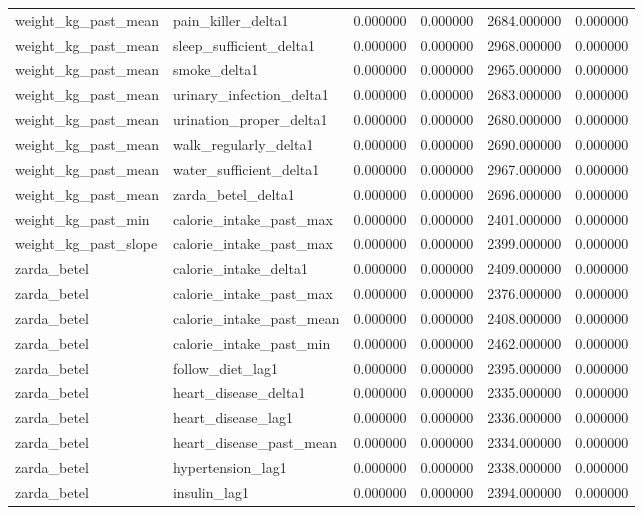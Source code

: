 \begin{longtable}{llrrrr}
weight\_kg\_past\_mean & pain\_killer\_delta1 & 0.000000 & 0.000000 & 2684.000000 & 0.000000 \\
weight\_kg\_past\_mean & sleep\_sufficient\_delta1 & 0.000000 & 0.000000 & 2968.000000 & 0.000000 \\
weight\_kg\_past\_mean & smoke\_delta1 & 0.000000 & 0.000000 & 2965.000000 & 0.000000 \\
weight\_kg\_past\_mean & urinary\_infection\_delta1 & 0.000000 & 0.000000 & 2683.000000 & 0.000000 \\
weight\_kg\_past\_mean & urination\_proper\_delta1 & 0.000000 & 0.000000 & 2680.000000 & 0.000000 \\
weight\_kg\_past\_mean & walk\_regularly\_delta1 & 0.000000 & 0.000000 & 2690.000000 & 0.000000 \\
weight\_kg\_past\_mean & water\_sufficient\_delta1 & 0.000000 & 0.000000 & 2967.000000 & 0.000000 \\
weight\_kg\_past\_mean & zarda\_betel\_delta1 & 0.000000 & 0.000000 & 2696.000000 & 0.000000 \\
weight\_kg\_past\_min & calorie\_intake\_past\_max & 0.000000 & 0.000000 & 2401.000000 & 0.000000 \\
weight\_kg\_past\_slope & calorie\_intake\_past\_max & 0.000000 & 0.000000 & 2399.000000 & 0.000000 \\
zarda\_betel & calorie\_intake\_delta1 & 0.000000 & 0.000000 & 2409.000000 & 0.000000 \\
zarda\_betel & calorie\_intake\_past\_max & 0.000000 & 0.000000 & 2376.000000 & 0.000000 \\
zarda\_betel & calorie\_intake\_past\_mean & 0.000000 & 0.000000 & 2408.000000 & 0.000000 \\
zarda\_betel & calorie\_intake\_past\_min & 0.000000 & 0.000000 & 2462.000000 & 0.000000 \\
zarda\_betel & follow\_diet\_lag1 & 0.000000 & 0.000000 & 2395.000000 & 0.000000 \\
zarda\_betel & heart\_disease\_delta1 & 0.000000 & 0.000000 & 2335.000000 & 0.000000 \\
zarda\_betel & heart\_disease\_lag1 & 0.000000 & 0.000000 & 2336.000000 & 0.000000 \\
zarda\_betel & heart\_disease\_past\_mean & 0.000000 & 0.000000 & 2334.000000 & 0.000000 \\
zarda\_betel & hypertension\_lag1 & 0.000000 & 0.000000 & 2338.000000 & 0.000000 \\
zarda\_betel & insulin\_lag1 & 0.000000 & 0.000000 & 2394.000000 & 0.000000 \\

\end{longtable}
